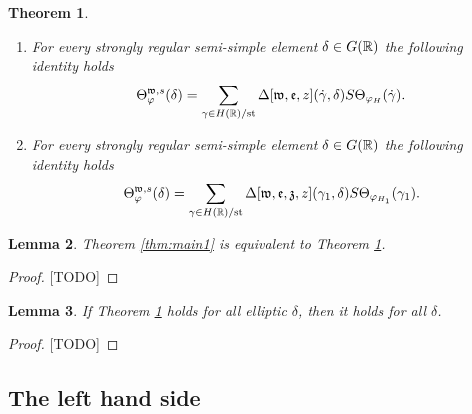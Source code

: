 \documentclass{article}
\newtheorem{thm}{Theorem}[subsection]
\newtheorem{lem}[thm]{Lemma}
\theoremstyle{definition}
\numberwithin{equation}{section}
\renewcommand{\-}{\hyp{}}
\newcommand{\warn}[1]{{\leavevmode\color{red}[#1]}}
\begin{document}
\begin{thm} \label{thm:main2}
\begin{enumerate}
	\item For every strongly regular semi-simple element $\delta \in G(\mathbb{R})$ the following identity holds
	\[ \Theta_\varphi^{\mathfrak{w},s}(\delta) = \sum_{\gamma \in H(\mathbb{R})/\textrm{st}} \Delta[\mathfrak{w},\mathfrak{e},z](\dot\gamma,\delta)S\Theta_{\varphi_H}(\dot\gamma). \]
	\item For every strongly regular semi-simple element $\delta \in G(\mathbb{R})$ the following identity holds
	\[ \Theta_\varphi^{\mathfrak{w},s}(\delta) = \sum_{\gamma \in H(\mathbb{R})/\textrm{st}} \Delta[\mathfrak{w},\mathfrak{e},\mathfrak{z},z](\gamma_1,\delta)S\Theta_{\varphi_{H_1}}(\gamma_1). \]
\end{enumerate}
\end{thm}


\begin{lem}
Theorem \ref{thm:main1} is equivalent to Theorem \ref{thm:main2}.
\end{lem}
\begin{proof}
\warn{TODO}
\end{proof}

\begin{lem}
If Theorem \ref{thm:main2} holds for all elliptic $\delta$, then it holds for all $\delta$.
\end{lem}
\begin{proof}
\warn{TODO}
\end{proof}

\subsection{The left hand side}


\end{document}
